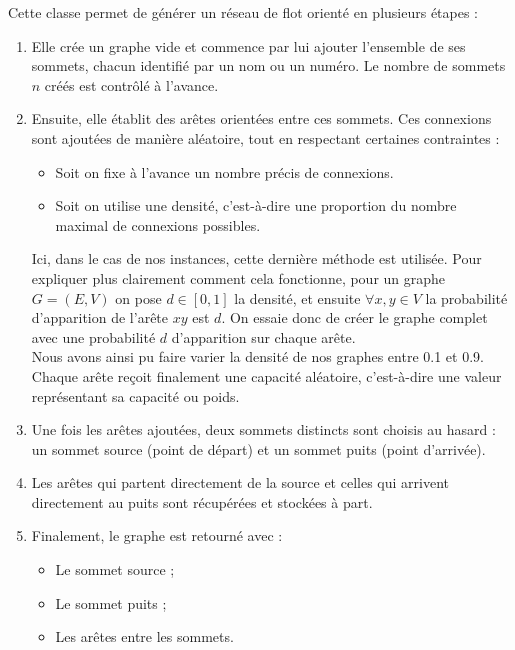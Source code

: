 \documentclass[a4paper]{article}
\begin{document}
Cette classe permet de générer un réseau de flot orienté en plusieurs étapes :

\begin{enumerate}
    \item Elle crée un graphe vide et commence par lui ajouter l'ensemble de ses sommets, chacun identifié par un nom ou un numéro. Le nombre de sommets $n$ créés est contrôlé à l'avance.
    
    \item Ensuite, elle établit des arêtes orientées entre ces sommets. Ces connexions sont ajoutées de manière aléatoire, tout en respectant certaines contraintes :
    \begin{itemize}
        \item Soit on fixe à l’avance un nombre précis de connexions.
        \item Soit on utilise une densité, c’est-à-dire une proportion du nombre maximal de connexions possibles.
    \end{itemize}
	Ici, dans le cas de nos instances, cette dernière méthode est utilisée. Pour expliquer plus clairement comment cela fonctionne, pour un graphe $G=(E,V)$ on pose $d \in [0,1]$ la densité, et ensuite $\forall x, y \in V$ la probabilité d'apparition de l'arête $xy$ est $d$. On essaie donc de créer le graphe complet avec une probabilité $d$ d'apparition sur chaque arête.\\
	Nous avons ainsi pu faire varier la densité de nos graphes entre 0.1 et 0.9.\\
    Chaque arête reçoit finalement une capacité aléatoire, c’est-à-dire une valeur représentant sa \og capacité\fg{} ou \og poids\fg{}.
    
    \item Une fois les arêtes ajoutées, deux sommets distincts sont choisis au hasard : un sommet source (point de départ) et un sommet puits (point d’arrivée).
    
    \item Les arêtes qui partent directement de la source et celles qui arrivent directement au puits sont récupérées et stockées à part.
    
    \item Finalement, le graphe est retourné avec :
    \begin{itemize}
        \item Le sommet source ;
        \item Le sommet puits ;
        \item Les arêtes entre les sommets.
    \end{itemize}
\end{enumerate}
\end{document}
